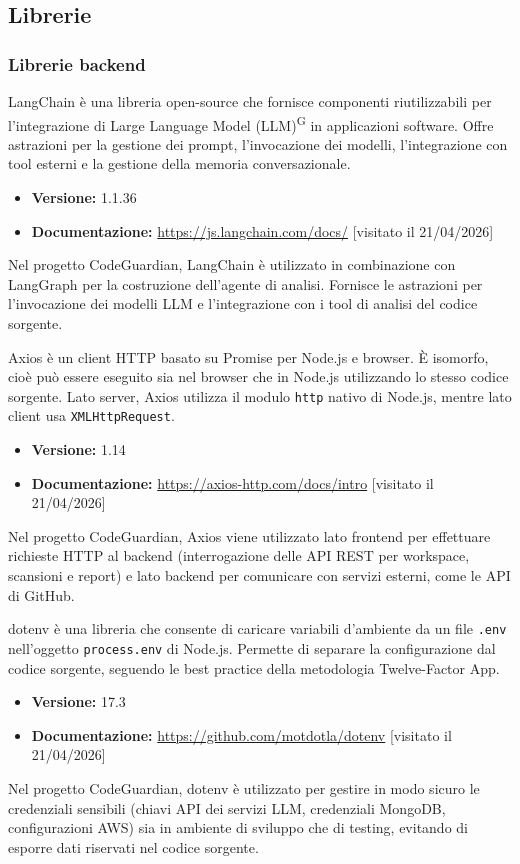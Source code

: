 \documentclass[a4paper, 11pt]{article}
\newcounter{subsubsubsection}[subsubsection]
\begin{document}
\subsection{Librerie}

\subsubsection{Librerie backend}

LangChain è una libreria open-source che fornisce componenti riutilizzabili per l'integrazione di Large Language Model (LLM)\textsuperscript{G} in applicazioni software. Offre astrazioni per la gestione dei prompt, l'invocazione dei modelli, l'integrazione con tool esterni e la gestione della memoria conversazionale.
\begin{itemize}
  \item \textbf{Versione:} 1.1.36
  \item \textbf{Documentazione:} \url{https://js.langchain.com/docs/} [visitato il 21/04/2026]
\end{itemize}
Nel progetto CodeGuardian, LangChain è utilizzato in combinazione con LangGraph per la costruzione dell'agente di analisi. Fornisce le astrazioni per l'invocazione dei modelli LLM e l'integrazione con i tool di analisi del codice sorgente.

Axios è un client HTTP basato su Promise per Node.js e browser. È isomorfo, cioè può essere eseguito sia nel browser che in Node.js utilizzando lo stesso codice sorgente. Lato server, Axios utilizza il modulo \texttt{http} nativo di Node.js, mentre lato client usa \texttt{XMLHttpRequest}.
\begin{itemize}
  \item \textbf{Versione:} 1.14
  \item \textbf{Documentazione:} \url{https://axios-http.com/docs/intro} [visitato il 21/04/2026]
\end{itemize}
Nel progetto CodeGuardian, Axios viene utilizzato lato frontend per effettuare richieste HTTP al backend (interrogazione delle API REST per workspace, scansioni e report) e lato backend per comunicare con servizi esterni, come le API di GitHub.

dotenv è una libreria che consente di caricare variabili d'ambiente da un file \texttt{.env} nell'oggetto \texttt{process.env} di Node.js. Permette di separare la configurazione dal codice sorgente, seguendo le best practice della metodologia Twelve-Factor App.
\begin{itemize}
  \item \textbf{Versione:} 17.3
  \item \textbf{Documentazione:} \url{https://github.com/motdotla/dotenv} [visitato il 21/04/2026]
\end{itemize}
Nel progetto CodeGuardian, dotenv è utilizzato per gestire in modo sicuro le credenziali sensibili (chiavi API dei servizi LLM, credenziali MongoDB, configurazioni AWS) sia in ambiente di sviluppo che di testing, evitando di esporre dati riservati nel codice sorgente.
\end{document}
